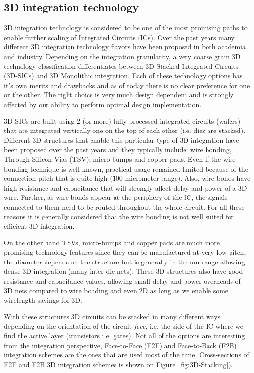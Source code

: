 \subsection{3D integration technology}
3D integration technology is considered to be one of the most promising paths to enable further scaling of Integrated Circuits (ICs). Over the past years many different 3D integration technology flavors have been proposed in both academia and industry. Depending on the integration granularity, a very coarse grain 3D technology classification differentiates between 3D-Stacked Integrated Circuits (3D-SICs) and 3D Monolithic integration. Each of these technology options has it's own merits and drawbacks and as of today there is no clear preference for one or the other. The right choice is very much design dependent and is strongly affected by our ability to perform optimal design implementation.

3D-SICs are built using 2 (or more) fully processed integrated circuits (wafers) that are integrated vertically one on the top of each other (i.e. dies are stacked). Different 3D structures that enable this particular type of 3D integration have been proposed over the past years and they typically include: wire bonding, Through Silicon Vias (TSV), micro-bumps and copper pads. Even if the wire bonding technique is well known, practical usage remained limited because of the connection pitch that is quite high (\~100 micrometer range). Also, wire bonds have high resistance and capacitance that will strongly affect delay and power of a 3D wire. Further, as wire bonds appear at the periphery of the IC, the signals connected to them need to be routed throughout the whole circuit. For all these reasons it is generally considered that the wire bonding is not well suited for efficient 3D integration. 

On the other hand TSVs, micro-bumps and copper pads are much more promising technology features since they can be manufactured at very low pitch, the diameter depends on the structure but is generally in the um range allowing dense 3D integration (many inter-die nets). These 3D structures also have good resistance and capacitance values, allowing small delay and power overheads of 3D nets compared to wire bonding and even 2D as long as we enable some wirelength savings for 3D. 

With these structures 3D circuits can be stacked in many different ways depending on the orientation of the circuit \emph{face}, i.e. the side of the IC where we find the active layer (transistors i.e. gates). Not all of the options are interesting from the integration perspective, Face-to-Face (F2F) and Face-to-Back (F2B) integration schemes are the ones that are used most of the time. Cross-sections of F2F and F2B 3D integration schemes is shown on Figure~\ref{fig:3D-Stacking}).


